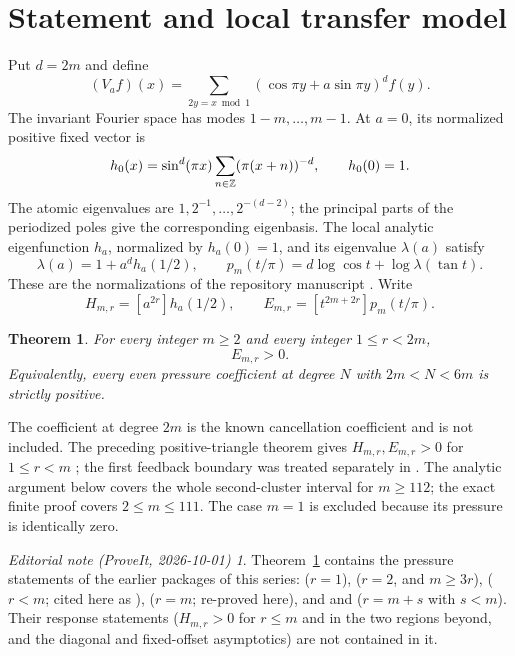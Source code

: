 \documentclass[11pt,a4paper]{article}
\newtheorem{theorem}{Theorem}[section]\newtheorem{lemma}[theorem]{Lemma}\newtheorem{proposition}[theorem]{Proposition}
\theoremstyle{remark}\newtheorem*{ednote}{Editorial note (ProveIt, 2026-10-01)}
\begin{document}
\section{Statement and local transfer model}
Put $d=2m$ and define
\[
 (V_af)(x)=\sum_{2y=x\bmod1}(\cos\pi y+a\sin\pi y)^d f(y).
\]
The invariant Fourier space has modes $1-m,\ldots,m-1$. At $a=0$, its normalized positive fixed vector is
\[
 h_0(x)=\sin^d(\pi x)\sum_{n\in\mathbb Z}(\pi(x+n))^{-d},\qquad h_0(0)=1.
\]
The atomic eigenvalues are $1,2^{-1},\ldots,2^{-(d-2)}$; the principal parts of the periodized poles give the corresponding eigenbasis. The local analytic eigenfunction $h_a$, normalized by $h_a(0)=1$, and its eigenvalue $\lambda(a)$ satisfy
\begin{equation}\label{eq:feedback}
 \lambda(a)=1+a^d h_a(1/2),\qquad
 p_m(t/\pi)=d\log\cos t+\log\lambda(\tan t).
\end{equation}
These are the normalizations of the repository manuscript \cite{integer}. Write
\[
 H_{m,r}=[a^{2r}]h_a(1/2),\qquad
 E_{m,r}=[t^{2m+2r}]p_m(t/\pi).
\]
\begin{theorem}\label{thm:main}
For every integer $m\ge2$ and every integer $1\le r<2m$,
\[
 E_{m,r}>0.
\]
Equivalently, every even pressure coefficient at degree $N$ with $2m<N<6m$ is strictly positive.
\end{theorem}
The coefficient at degree $2m$ is the known cancellation coefficient and is not included. The preceding positive-triangle theorem gives $H_{m,r},E_{m,r}>0$ for $1\le r<m$ \cite{triangle}; the first feedback boundary was treated separately in \cite{boundary}. The analytic argument below covers the whole second-cluster interval for $m\ge112$; the exact finite proof covers $2\le m\le111$. The case $m=1$ is excluded because its pressure is identically zero.
\begin{ednote}
Theorem~\ref{thm:main} contains the pressure statements of the earlier packages of this series:
 ($r=1$),  ($r=2$, and
$m\ge3r$),  ($r<m$; cited here as \cite{triangle}),
 ($r=m$; re-proved here), and  and  ($r=m+s$ with $s<m$). Their response statements
($H_{m,r}>0$ for $r\le m$ and in the two regions beyond, and the diagonal and fixed-offset
asymptotics) are not contained in it.
\end{ednote}
\end{document}
